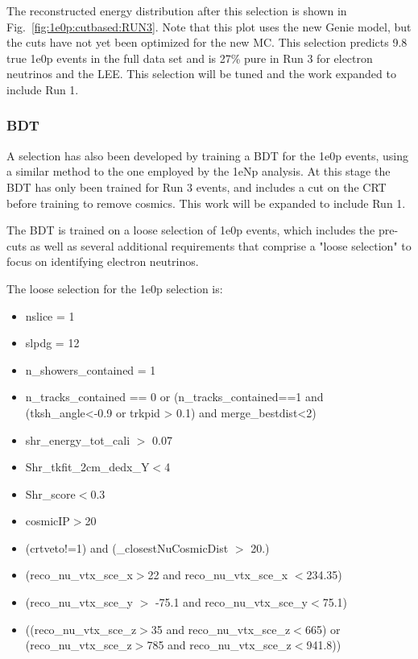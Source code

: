 \documentclass[a4paper]{article}
\begin{document}
The reconstructed energy distribution after this selection is shown in Fig.~\ref{fig:1e0p:cutbased:RUN3}.  Note that this plot uses the new Genie model, but the cuts have not yet been optimized for the new MC.  This selection predicts 9.8 true 1e0p events in the full data set and is 27\% pure in Run 3 for electron neutrinos and the LEE.  This selection will be tuned and the work expanded to include Run 1.

\subsubsection{BDT}

A selection has also been developed by training a BDT for the 1e0p events, using a similar method to the one employed by the 1eNp analysis.  At this stage the BDT has only been trained for Run 3 events, and includes a cut on the CRT before training to remove cosmics.  This work will be expanded to include Run 1.

The BDT is trained on a loose selection of 1e0p events, which includes the pre-cuts as well as several additional requirements that comprise a "loose selection" to focus on identifying electron neutrinos.

The loose selection for the 1e0p selection is:
\begin{itemize}
    \item nslice = 1
    \item slpdg = 12
    \item n\_showers\_contained = 1
    \item n\_tracks\_contained == 0 or (n\_tracks\_contained==1 and (tksh\_angle<-0.9 or trkpid > 0.1) and merge\_bestdist<2)
    \item shr\_energy\_tot\_cali $>$ 0.07
    \item Shr\_tkfit\_2cm\_dedx\_Y$<$4
    \item Shr\_score$<$0.3
    \item cosmicIP$>$20
    \item (crtveto!=1) and (\_closestNuCosmicDist $>$ 20.)
    \item (reco\_nu\_vtx\_sce\_x$>$22 and reco\_nu\_vtx\_sce\_x $<$234.35)
    \item (reco\_nu\_vtx\_sce\_y $>$ -75.1 and reco\_nu\_vtx\_sce\_y$<$75.1)
    \item ((reco\_nu\_vtx\_sce\_z$>$35 and reco\_nu\_vtx\_sce\_z$<$665) or (reco\_nu\_vtx\_sce\_z$>$785 and reco\_nu\_vtx\_sce\_z$<$941.8))
\end{itemize}
\end{document}
